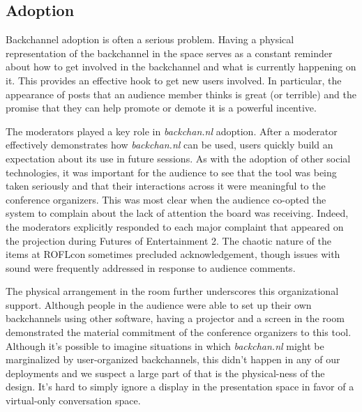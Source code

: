 \subsection{Adoption}

Backchannel adoption is often a serious problem. \citep{Orlikowski:1992tza} Having a physical representation of the backchannel in the space serves as a constant reminder about how to get involved in the backchannel and what is currently happening on it. This provides an effective hook to get new users involved. In particular, the appearance of posts that an audience member thinks is great (or terrible) and the promise that they can help promote or demote it is a powerful incentive. 

The moderators played a key role in \emph{backchan.nl} adoption. After a moderator effectively demonstrates how \emph{backchan.nl} can be used, users quickly build an expectation about its use in future sessions. As with the adoption of other social technologies, it was important for the audience to see that the tool was being taken seriously and that their interactions across it were meaningful to the conference organizers.\citep{Orlikowski:1992tza} This was most clear when the audience co-opted the system to complain about the lack of attention the board was receiving. Indeed, the moderators explicitly responded to each major complaint that appeared on the projection during Futures of Entertainment 2. The chaotic nature of the items at ROFLcon sometimes precluded acknowledgement, though issues with sound were frequently addressed in response to audience comments. 

The physical arrangement in the room further underscores this organizational support. Although people in the audience were able to set up their own backchannels using other software, having a projector and a screen in the room demonstrated the material commitment of the conference organizers to this tool. Although it's possible to imagine situations in which \emph{backchan.nl} might be marginalized by user-organized backchannels, this didn't happen in any of our deployments and we suspect a large part of that is the physical-ness of the design. It's hard to simply ignore a display in the presentation space in favor of a virtual-only conversation space.



